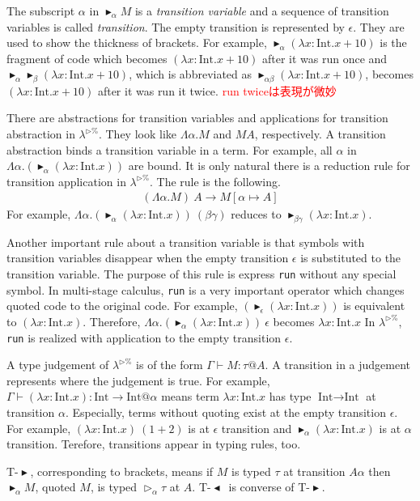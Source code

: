 \documentclass[runningheads]{llncs}
\newcommand{\red}[1]{\textcolor{red}{#1 }}
\newcommand{\LTP}{$\lambda^{\triangleright\%}$\xspace}
\newcommand{\G}{\Gamma}
\newcommand{\TW}{{\mathop{\triangleright}}}
\newcommand{\TB}{{\mathop{\blacktriangleright}}}
\newcommand{\TBL}{{\mathop{\blacktriangleleft}}}
\newcommand{\TTB}{\textsc{T-$\TB$}}
\newcommand{\TTBL}{\textsc{T-$\TBL$}}
\newcommand{\I}{\textrm{Int}}
\begin{document}
The subscript $\alpha$ in $\TB_\alpha M$ is a \textit{transition variable} and
a sequence of transition variables is called \textit{transition}.
The empty transition is represented by $\epsilon$.
They are used to show the thickness of brackets.
For example, $\TB_\alpha (\lambda x:\I.x+10)$ is the fragment of code which becomes $(\lambda x:\I.x+10)$ after it was run once and
$\TB_\alpha \TB_\beta (\lambda x:\I.x+10)$, which is abbreviated as $\TB_{\alpha\beta} (\lambda x:\I.x+10)$,
becomes $(\lambda x:\I.x+10)$ after it was run it twice.
\red{run twiceは表現が微妙}


There are abstractions for transition variables and applications for transition abstraction in \LTP.
They look like $\Lambda\alpha.M$ and $M A$, respectively.
A transition abstraction binds a transition variable in a term.
For example, all $\alpha$ in $\Lambda\alpha.(\TB_\alpha (\lambda x:\I.x))$ are bound.
It is only natural there is a reduction rule for transition application in \LTP.
The rule is the following.
\begin{align*}
    (\Lambda\alpha.M)\ A \longrightarrow M[\alpha\mapsto A] 
\end{align*}
For example, $\Lambda\alpha.(\TB_\alpha (\lambda x:\I.x))\ (\beta\gamma)$ reduces to $\TB_{\beta\gamma} (\lambda x:\I.x)$.


Another important rule about a transition variable is 
that symbols with transition variables disappear 
when the empty transition $\epsilon$ is substituted to the transition variable.
The purpose of this rule is express \verb|run| without any special symbol.
In multi-stage calculus, \verb|run| is a very important operator which changes quoted code to the original code.
For example, $(\TB_\epsilon (\lambda x:\I.x))$ is equivalent to $(\lambda x:\I.x)$.
Therefore, $\Lambda\alpha.(\TB_\alpha (\lambda x:\I.x))\ \epsilon$ becomes $\lambda x:\I.x$
In \LTP, \verb|run| is realized with application to the empty transition $\epsilon$.


A type judgement of \LTP is of the form $\G \vdash M : \tau @ A$.
A transition in a judgement represents where the judgement is true.
For example, $\G \vdash (\lambda x:\I.x) : \I \to \I @ \alpha$ means 
term $\lambda x:\I.x$ has type $\I \to \I$ at transition $\alpha$.
Especially, terms without quoting exist at the empty transition $\epsilon$.
For example, $(\lambda x:\I.x)\ (1+2)$ is at $\epsilon$ transition and 
$\TB_\alpha (\lambda x:\I.x)$ is at $\alpha$ transition.
Terefore, transitions appear in typing rules, too.
\begin{center}
    \infrule{\G\vdash M:\tau @{A\alpha}}{\G\vdash \TB_{\alpha}M:\TW_{\alpha}\tau @A}{\TTB} \andalso
    \infrule{\G\vdash M:\TW_{\alpha}\tau @A}{\G\vdash \TBL_{\alpha}M:\tau @{A\alpha}}{\TTBL}
\end{center}
\TTB, corresponding to brackets, means 
if $M$ is typed $\tau$ at transition $A\alpha$ then $\TB_{\alpha}M$, quoted $M$, is typed $\TW_{\alpha}\tau$ at $A$.
\TTBL\ is converse of \TTB.
\end{document}
